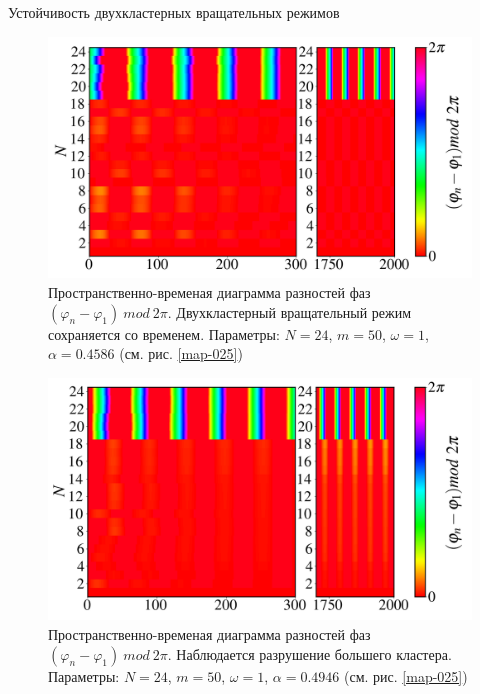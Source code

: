\begin{chapter}{Устойчивость двухкластерных вращательных режимов}
	\begin{figure}[h!]\center
		\includegraphics[width=1\columnwidth]{pictures/Figure_M_50_A_0.4586_O_1.png}
		\caption{Пространственно-временая диаграмма разностей фаз $(\varphi_n - \varphi_1) \ mod \ 2\pi$.
		Двухкластерный вращательный режим сохраняется со временем.
		Параметры: $N=24$, $m = 50$, $\omega = 1$, $\alpha = 0.4586$ (см. рис. \ref{map-025})}
		\label{st-c-1}
	\end{figure}

	\begin{figure}[h!]\center
		\includegraphics[width=1\columnwidth]{pictures/Figure_M_50_A_0.4946_O_1.png}
		\caption{Пространственно-временая диаграмма разностей фаз $(\varphi_n - \varphi_1) \ mod \ 2\pi$.
		Наблюдается разрушение большего кластера.
		Параметры: $N=24$, $m = 50$, $\omega = 1$, $\alpha = 0.4946$ (см. рис. \ref{map-025})}
		\label{st-c-2}
	\end{figure}


\end{chapter}
